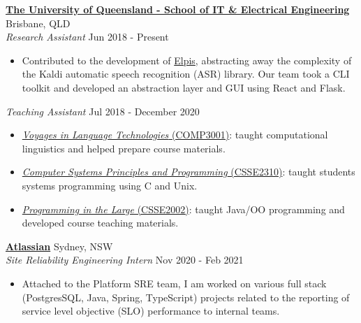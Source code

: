 \documentclass[a4paper]{article}
\newenvironment{myitemize}
{   \small
    \vspace{-2pt}
    \begin{itemize}
    \setlength{\itemsep}{0pt}
    \setlength{\parskip}{0pt}
    \setlength{\parsep}{0pt}     }
{ \end{itemize}                  }
\begin{document}
\textbf{\href{https://www.itee.uq.edu.au/}{The University of Queensland - School of IT \& Electrical Engineering}} \hfill Brisbane, QLD\\
\textit{Research Assistant} \hfill Jun 2018 - Present\\
\begin{myitemize} \itemsep 0.5mm
	\item Contributed to the development of \href{https://github.com/CoEDL/elpis}{Elpis}, abstracting away the complexity of the Kaldi automatic speech recognition (ASR) library. Our team took a CLI toolkit and developed an abstraction layer and GUI using React and Flask.
\end{myitemize}
\vspace{-1mm}
\textit{Teaching Assistant} \hfill Jul 2018 - December 2020\\
\vspace{-0.5mm}
\begin{myitemize} \itemsep 0.5mm
	\item 
		\href{http://bit.ly/comp3001-ecp}
			{\textit{Voyages in Language Technologies} (COMP3001)}: 
			taught computational linguistics and helped prepare course materials.
	\item 
		\href{http://bit.ly/csse2310-ec}
			{\textit{Computer Systems Principles and Programming} (CSSE2310)}: 
			taught students systems programming using C and Unix.
	\item 
		\href{http://bit.ly/csse2002-ecp}
			{\textit{Programming in the Large} (CSSE2002)}: 
			taught Java/OO programming and developed course teaching materials.
\end{myitemize}


\textbf{\href{https://www.atlassian.com/}{Atlassian}} \hfill Sydney, NSW\\
\textit{Site Reliability Engineering Intern} \hfill Nov 2020 - Feb 2021 \\
\begin{myitemize}
	\item Attached to the Platform SRE team, I am worked on various full stack (PostgresSQL, Java, Spring, TypeScript) projects related to the reporting of service level objective (SLO) performance to internal teams.
\end{myitemize}
\end{document}
